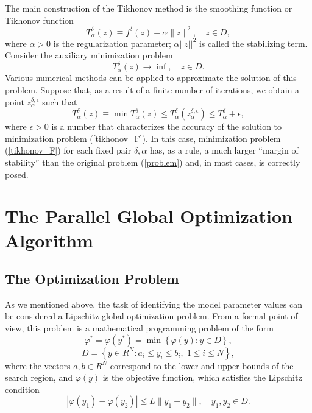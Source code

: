 \documentclass{svproc}
\begin{document}
The main construction of the Tikhonov method is the smoothing function or Tikhonov function
\begin{equation}\label{formula_T}
T_\alpha^\delta(z) \equiv f^\delta(z) + \alpha \lVert z\rVert^2,\quad z \in D,
\end{equation}
where $\alpha > 0$ is the regularization parameter; $\alpha||z||^2$ is called the stabilizing term. Consider the auxiliary minimization problem
\begin{equation}
T_\alpha^\delta(z) \rightarrow \inf,\quad z \in D.
\label{tikhonov_F}
\end{equation}
Various numerical methods can be applied to approximate the solution of this problem. Suppose that, as a result of a finite number of iterations, we obtain a point $z_\alpha^{\delta,\epsilon}$ such that
\begin{equation}
T_\alpha^\delta(z) \equiv \min T_{\alpha}^{\delta}(z) \leq T_{\alpha}^{\delta} (z_{\alpha}^{\delta,\epsilon}) \leq T_{\alpha}^{\delta} + \epsilon,
\end{equation}
where $\epsilon > 0$ is a number that characterizes the accuracy of the solution to minimization problem (\ref{tikhonov_F}). In this case, minimization problem (\ref{tikhonov_F}) for each fixed pair $\delta, \alpha$ has, as a rule, a much larger ``margin of stability'' than the original problem (\ref{problem}) and, in most cases, is correctly posed.

\section{The Parallel Global Optimization Algorithm}\label{Sec_GSA}

\subsection{The Optimization Problem}\label{Sec_GO_Problem}

As we mentioned above, the task of identifying the model parameter values can be considered a Lipschitz global optimization problem. From a formal point of view, this problem is a mathematical programming problem of the form
\begin{equation} \label{problemN}
 \varphi^* = \varphi(y^\ast)=\min{\left\{\varphi(y):y\in D\right\}},
 \end{equation}
\begin{equation} \label{D}
 D=\left\{y\in R^N : a_i\leq y_i \leq b_i, \;  1\leq i \leq N\right\},
 \end{equation}
where the vectors $a,b\in R^N$ correspond to the lower and upper bounds of the search region, and $\varphi(y)$ is the objective function, which satisfies the Lipschitz condition
\begin{equation}\label{Lip}
\left|\varphi(y_1)-\varphi(y_2)\right|\leq L\lVert y_1-y_2\rVert,\quad
y_1,y_2 \in D.
\end{equation}
\end{document}
